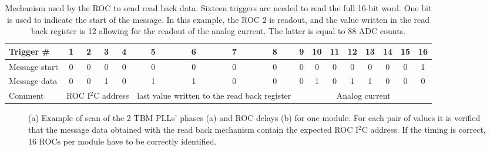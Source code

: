 \begin{table}[!htb]
  \caption{Mechanism used by the ROC to send read back data. Sixteen triggers are needed to read the full 16-bit word. One bit is used to indicate the start of the message.
  In this example, the ROC 2 is readout, and the value written in the read back register is 12 allowing for the readout of the analog current. The latter is equal to 88 ADC counts.}
  \centering
  \begin{tabular}{|l|*{16}{c|}}
    \hline
    Trigger \#        & 1 & 2 & 3 & 4 & 5 & 6 & 7 & 8 & 9 & 10 & 11 & 12 & 13 & 14 & 15 & 16\\
    \hline
    Message start & 0 & 0 & 0 & 0 & 0 & 0 & 0 & 0 & 0 & 0   & 0  & 0   & 0   & 0   & 0   & 1\\
    \hline
    Message data & 0 & 0 & 1 & 0 & 1 & 1 & 0 & 0 & 0 & 1   & 0  & 1   & 1   & 0   & 0   & 0\\
    \hline
    Comment        & \multicolumn{4}{p{2cm}|}{\footnotesize ROC I$^2$C address} & \multicolumn{4}{p{2cm}|}{\footnotesize last value written to the read back register} & \multicolumn{8}{p{4cm}|}{\footnotesize Analog current}\\

    \hline    
  \end{tabular}
  \label{tab:ReadBack}
\end{table}

\begin{figure}[!htb]
 \begin{center}
 \end{center}
 \caption{(a) Example of scan of the 2 TBM PLLs' phases (a) and ROC delays (b) for one module. For each pair of values it is verified that the message data obtained with the read back mechanism contain the expected ROC I$^2$C address. If the timing is correct, 16 ROCs per module have to be correctly identified.}
 \label{fig:TBMROCdelaysRB}
\end{figure} 

